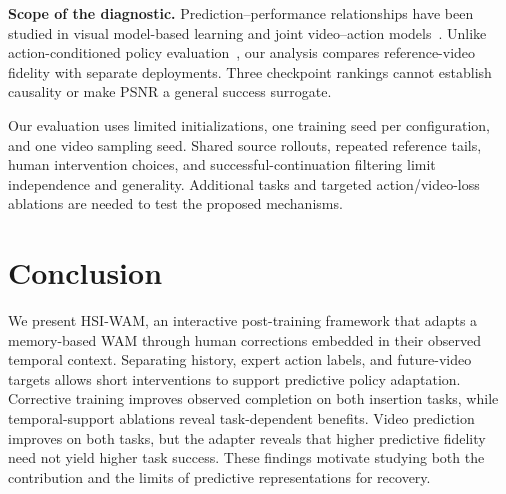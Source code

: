 \documentclass[letterpaper,10pt,conference]{ieeeconf}
\begin{document}
\textbf{Scope of the diagnostic.} Prediction--performance relationships have been studied in visual model-based learning and joint video--action models~\cite{modelspixels,videovla}. Unlike action-conditioned policy evaluation~\cite{worldgym}, our analysis compares reference-video fidelity with separate deployments. Three checkpoint rankings cannot establish causality or make PSNR a general success surrogate.

Our evaluation uses limited initializations, one training seed per configuration, and one video sampling seed. Shared source rollouts, repeated reference tails, human intervention choices, and successful-continuation filtering limit independence and generality. Additional tasks and targeted action/video-loss ablations are needed to test the proposed mechanisms.

\section{Conclusion}
We present HSI-WAM, an interactive post-training framework that adapts a memory-based WAM through human corrections embedded in their observed temporal context. Separating history, expert action labels, and future-video targets allows short interventions to support predictive policy adaptation. Corrective training improves observed completion on both insertion tasks, while temporal-support ablations reveal task-dependent benefits. Video prediction improves on both tasks, but the adapter reveals that higher predictive fidelity need not yield higher task success. These findings motivate studying both the contribution and the limits of predictive representations for recovery.



\end{document}

